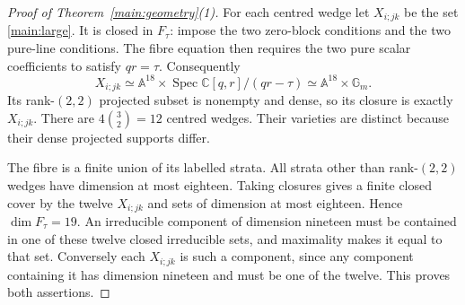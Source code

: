 \documentclass[11pt,letterpaper]{article}
\newcommand{\C}{\mathbb C}
\newcommand{\A}{\mathbb A}
\newcommand{\Gm}{\mathbb G_m}
\newcommand{\Ftau}{F_\tau}
\theoremstyle{definition}
\begin{document}
\begin{proof}[Proof of Theorem~\ref{main:geometry}(1)]
For each centred wedge let \(X_{i;jk}\) be the set
\eqref{main:large}. It is closed in \(\Ftau\): impose the two zero-block
conditions and the two pure-line conditions. The fibre equation then
requires the two pure scalar coefficients to satisfy \(qr=\tau\).
Consequently
\[
 X_{i;jk}\simeq\A^{18}\times
 \operatorname{Spec}\C[q,r]/(qr-\tau)
 \simeq\A^{18}\times\Gm.
\]
Its rank-\((2,2)\) projected subset is nonempty and dense, so its closure
is exactly \(X_{i;jk}\). There are \(4\binom32=12\) centred wedges.
Their varieties are distinct because their dense projected supports differ.

The fibre is a finite union of its labelled strata.
All strata other than rank-\((2,2)\) wedges have dimension at most eighteen.
Taking closures gives a finite closed cover by the twelve \(X_{i;jk}\)
and sets of dimension at most eighteen. Hence \(\dim\Ftau=19\).
An irreducible component of dimension nineteen must be contained in one
of these twelve closed irreducible sets, and maximality makes it equal
to that set. Conversely each \(X_{i;jk}\) is such a component, since any
component containing it has dimension nineteen and must be one of the
twelve. This proves both assertions.
\end{proof}
\end{document}
